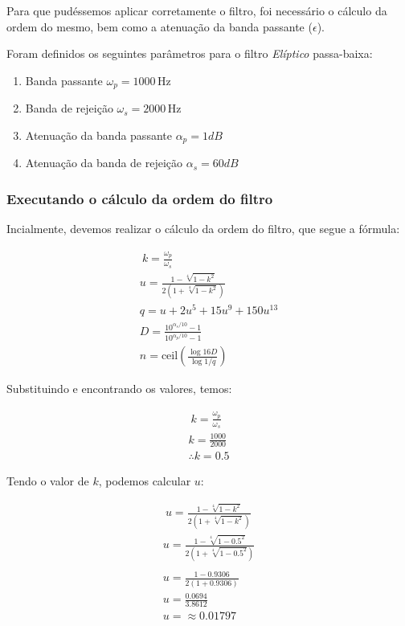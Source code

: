 Para que pudéssemos aplicar corretamente o filtro, foi necessário o cálculo da ordem do mesmo, bem como a atenuação da banda passante ($\epsilon$).

Foram definidos os seguintes parâmetros para o filtro \textit{Elíptico} passa-baixa:

\begin{enumerate}
    \item Banda passante $\omega_p=1000 \, \text{Hz}$
    \item Banda de rejeição $\omega_s = 2000\, \text{Hz}$
    \item Atenuação da banda passante $\alpha_p = 1dB$
    \item Atenuação da banda de rejeição $\alpha_s = 60dB$
\end{enumerate}


\subsubsection*{Executando o cálculo da ordem do filtro}
Incialmente, devemos realizar o cálculo da ordem do filtro, que segue a fórmula:

\begin{align} \
    k = \frac{\omega_p}{\omega_s}                           \\
    u = \frac{1 - \sqrt[4]{1 - k^2}}{2 (1+\sqrt[4]{1-k^2})} \\
    q = u + 2u^5 + 15u^9 + 150u^13                          \\
    D = \frac{10^{\alpha_s/10} - 1}{10^{\alpha_p/10}-1}     \\
    n = \text{ceil} \left( \frac{\log{16D}}{\log{1/q}} \right)
\end{align}

Substituindo e encontrando os valores, temos:

\begin{align*} \
    k = \frac{\omega_p}{\omega_s} \\
    k = \frac{1000}{2000}         \\
    \therefore k = 0.5
\end{align*}

Tendo o valor de $k$, podemos calcular $u$:

\begin{align*} \
    u = \frac{1 - \sqrt[4]{1 - k^2}}{2 (1 + \sqrt[4]{1 - k^2})}     \\
    u = \frac{1 - \sqrt[4]{1 - 0.5^2}}{2 (1 + \sqrt[4]{1 - 0.5^2})} \\
    \\
    u = \frac{1 - 0.9306}{2 (1 + 0.9306)}                           \\
    u = \frac{0.0694}{3.8612}                                       \\
    u =\approx 0.01797
\end{align*}

